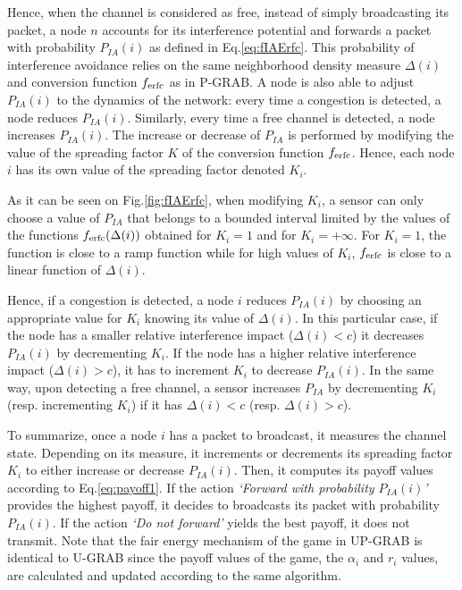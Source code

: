 \documentclass[journal, peerreview, onecolumn, draftcls]{IEEEtran}
\begin{document}
Hence, when the channel is considered as free, instead of simply broadcasting its packet, a node $n$ accounts for its interference potential and forwards a packet with probability $P_{IA}(i)$ as defined in Eq.\eqref{eq:fIAErfc}.
This probability of interference avoidance relies on the same neighborhood density measure $\Delta(i)$ and conversion function $f_{\rm erfc}$ as in P-GRAB.
A node is also able to adjust $P_{IA}(i)$ to the dynamics of the network: every time a congestion is detected, a node reduces $P_{IA}(i)$. Similarly, every time a free channel is detected, a node increases $P_{IA}(i)$. The increase or decrease of $P_{IA}$ is performed by modifying the value of the spreading factor $K$ of the conversion function $f_{\rm erfc}$. Hence, each node $i$ has its own value of the spreading factor denoted $K_i$.

As it can be seen on Fig.\ref{fig:fIAErfc}, when modifying $K_i$, a sensor can only choose a value of $P_{IA}$ that belongs to a bounded interval limited by the values of the functions $f_{\rm erfc}(\Delta(i))$ obtained for $K_i=1$ and for $K_i=+\infty$. For $K_i=1$, the function is close to a ramp function while for high values of $K_i$, $f_{\rm erfc}$ is close to a linear function of $\Delta(i)$.

Hence, if a congestion is detected, a node $i$ reduces $P_{IA}(i)$ by choosing an appropriate value for $K_i$ knowing its value of $\Delta(i)$. In this particular case, if the node has a smaller relative interference impact ($\Delta(i)<c$) it decreases $P_{IA}(i)$ by decrementing $K_i$. If the node has a higher relative interference impact ($\Delta(i)>c$), it has to increment $K_i$ to decrease $P_{IA}(i)$.
In the same way, upon detecting a free channel, a sensor increases $P_{IA}$ by decrementing $K_i$ (resp. incrementing $K_i$) if it has $\Delta(i)<c$ (resp. $\Delta(i)>c$).

To summarize, once a node $i$ has a packet to broadcast, it measures the channel state. Depending on its measure, it increments or decrements its spreading factor $K_i$ to either increase or decrease $P_{IA}(i)$. Then, it computes its payoff values according to Eq.\ref{eq:payoff1}. If the action {\it `Forward with probability $P_{IA}(i)$'} provides the highest payoff, it decides to broadcasts its packet with probability $P_{IA}(i)$. If the action {\it `Do not forward'} yields the best payoff, it does not transmit.
Note that the fair energy mechanism of the game in UP-GRAB is identical to U-GRAB since the payoff values of the game, the $\alpha_i$ and $r_i$ values, are calculated and updated according to the same algorithm.
\end{document}
